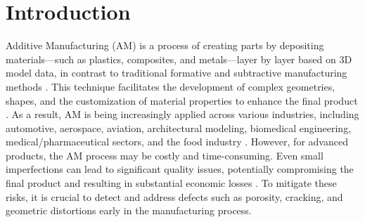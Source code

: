 \documentclass[preprint,12pt]{elsarticle}
\begin{document}
\clearpage

\section{Introduction}

Additive Manufacturing (AM) is a process of creating parts by depositing materials—such as plastics, composites, and metals—layer by layer based on 3D model data, in contrast to traditional formative and subtractive manufacturing methods \cite{RN321}. This technique facilitates the development of complex geometries, shapes, and the customization of material properties to enhance the final product \cite{RN322}. As a result, AM is being increasingly applied across various industries, including automotive, aerospace, aviation, architectural modeling, biomedical engineering, medical/pharmaceutical sectors, and the food industry \cite{RN324}. However, for advanced products, the AM process may be costly and time-consuming. Even small imperfections can lead to significant quality issues, potentially compromising the final product and resulting in substantial economic losses \cite{RN326}. To mitigate these risks, it is crucial to detect and address defects such as porosity, cracking, and geometric distortions early in the manufacturing process.
\end{document}
